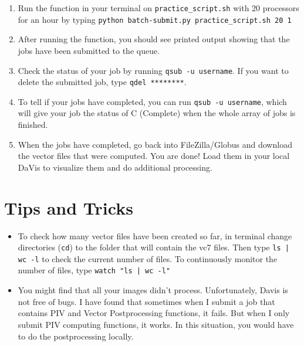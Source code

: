 \documentclass{article}
\begin{document}
\begin{enumerate}
    	\item Run the function in your terminal on \texttt{practice\_script.sh} with 20 processors for an hour by typing \texttt{python batch-submit.py practice\_script.sh 20 1}
    	
    	\item After running the function, you should see printed output showing that the jobs have been submitted to the queue.
    	
    	\item Check the status of your job by running \texttt{qsub -u username}.  If you want to delete the submitted job, type \texttt{qdel ********}.
    	
    	\item To tell if your jobs have completed, you can run \texttt{qsub -u username}, which will give your job the status of C (Complete) when the whole array of jobs is finished.  
    	
    	\item When the jobs have completed, go back into FileZilla/Globus and download the vector files that were computed.  You are done!  Load them in your local DaVis to visualize them and do additional processing.
	\end{enumerate}
    
    \section{Tips and Tricks}
    \begin{itemize}
        \item To check how many vector files have been created so far, in terminal change directories (\texttt{cd}) to the folder that will contain the vc7 files.  Then type \texttt{ls | wc -l} to check the current number of files.  To continuously monitor the number of files, type \texttt{watch "ls | wc -l"}
        \item You might find that all your images didn't process.  Unfortunately, Davis is not free of bugs.  I have found that sometimes when I submit a job that contains PIV and Vector Postprocessing functions, it fails.  But when I only submit PIV computing functions, it works.  In this situation, you would have to do the postprocessing locally.
    \end{itemize}
\end{document}
